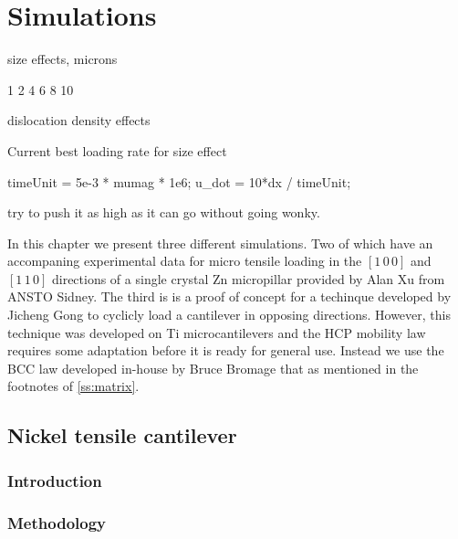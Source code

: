 \chapter{Simulations}\label{c:simulations}

size effects, microns

1
2
4
6
8
10

dislocation density effects



Current best loading rate for size effect

timeUnit = 5e-3 * mumag * 1e6;
u\_dot = 10*dx / timeUnit;

try to push it as high as it can go without going wonky.


In this chapter we present three different simulations. Two of which have an accompaning experimental data for micro tensile loading in the $[1\, 0\, 0]$ and $[1\, 1\, 0]$ directions of a single crystal Zn micropillar provided by Alan Xu from ANSTO Sidney. The third is is a proof of concept for a techinque developed by Jicheng Gong to cyclicly load a cantilever in opposing directions. However, this technique was developed on Ti microcantilevers and the HCP mobility law requires some adaptation before it is ready for general use. Instead we use the BCC law developed in-house by Bruce Bromage that as mentioned in the footnotes of \cref{ss:matrix}.

\section{Nickel tensile cantilever}\label{s:nickelTensile}
\subsection{Introduction}
\subsection{Methodology}

